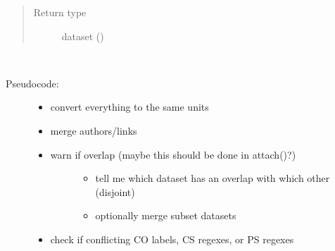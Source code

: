 \documentclass[letterpaper,10pt,english]{sphinxmanual}
\begin{document}
\begin{fulllineitems}
\begin{fulllineitems}
\begin{quote}
\begin{description}
\item[{Return type}] \leavevmode
\sphinxAtStartPar
dataset ({\hyperref[\detokenize{dataset:colabfit.tools.dataset.Dataset}]{}})

\end{description}\end{quote}

\end{fulllineitems}


\begin{fulllineitems}
\label{\detokenize{dataset:colabfit.tools.dataset.Dataset.flatten}}~\begin{description}
\item[{Pseudocode:}] \leavevmode\begin{itemize}
\item {} 
\sphinxAtStartPar
convert everything to the same units

\item {} 
\sphinxAtStartPar
merge authors/links

\item {} \begin{description}
\item[{warn if overlap (maybe this should be done in attach()?)}] \leavevmode\begin{itemize}
\item {} 
\sphinxAtStartPar
tell me which dataset has an overlap with which other (disjoint)

\item {} 
\sphinxAtStartPar
optionally merge subset datasets

\end{itemize}

\end{description}

\item {} 
\sphinxAtStartPar
check if conflicting CO labels, CS regexes, or PS regexes

\end{itemize}

\end{description}

\end{fulllineitems}



\end{fulllineitems}
\end{document}
